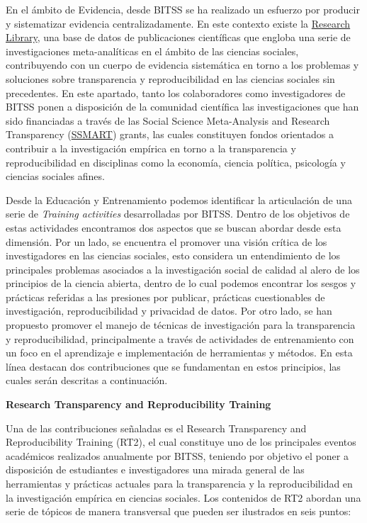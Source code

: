 \documentclass[
  spanish,
  letterpaper,
  DIV=11,
  numbers=noendperiod]{scrreprt}
\begin{document}
En el ámbito de Evidencia, desde BITSS se ha realizado un esfuerzo por
producir y sistematizar evidencia centralizadamente. En este contexto
existe la \href{https://www.bitss.org/research-library/}{Research
Library}, una base de datos de publicaciones científicas que engloba una
serie de investigaciones meta-analíticas en el ámbito de las ciencias
sociales, contribuyendo con un cuerpo de evidencia sistemática en torno
a los problemas y soluciones sobre transparencia y reproducibilidad en
las ciencias sociales sin precedentes. En este apartado, tanto los
colaboradores como investigadores de BITSS ponen a disposición de la
comunidad científica las investigaciones que han sido financiadas a
través de las Social Science Meta-Analysis and Research Transparency
(\href{https://www.bitss.org/ssmart-grants/}{SSMART}) grants, las cuales
constituyen fondos orientados a contribuir a la investigación empírica
en torno a la transparencia y reproducibilidad en disciplinas como la
economía, ciencia política, psicología y ciencias sociales afines.

Desde la Educación y Entrenamiento podemos identificar la articulación
de una serie de \emph{Training activities} desarrolladas por BITSS.
Dentro de los objetivos de estas actividades encontramos dos aspectos
que se buscan abordar desde esta dimensión. Por un lado, se encuentra el
promover una visión crítica de los investigadores en las ciencias
sociales, esto considera un entendimiento de los principales problemas
asociados a la investigación social de calidad al alero de los
principios de la ciencia abierta, dentro de lo cual podemos encontrar
los sesgos y prácticas referidas a las presiones por publicar, prácticas
cuestionables de investigación, reproducibilidad y privacidad de datos.
Por otro lado, se han propuesto promover el manejo de técnicas de
investigación para la transparencia y reproducibilidad, principalmente a
través de actividades de entrenamiento con un foco en el aprendizaje e
implementación de herramientas y métodos. En esta línea destacan dos
contribuciones que se fundamentan en estos principios, las cuales serán
descritas a continuación.

\textbf{Research Transparency and Reproducibility Training}

Una de las contribuciones señaladas es el Research Transparency and
Reproducibility Training (RT2), el cual constituye uno de los
principales eventos académicos realizados anualmente por BITSS, teniendo
por objetivo el poner a disposición de estudiantes e investigadores una
mirada general de las herramientas y prácticas actuales para la
transparencia y la reproducibilidad en la investigación empírica en
ciencias sociales. Los contenidos de RT2 abordan una serie de tópicos de
manera transversal que pueden ser ilustrados en seis puntos:
\end{document}
